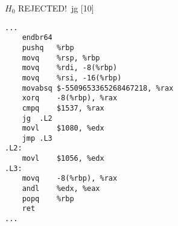 \begin{figure}[H]
    \centering
\begin{subfigure}[T]{0.2733333333333333\textwidth}
\vspace*{2mm}\tiny {\color{red}$H_0$ REJECTED!}\ \vspace*{2mm}\tiny jg [10]
\begin{lstlisting}[style=defstyle,language={[x86masm]Assembler},basicstyle=\tiny\ttfamily,breaklines=true]
...
	endbr64
	pushq	%rbp
	movq	%rsp, %rbp
	movq	%rdi, -8(%rbp)
	movq	%rsi, -16(%rbp)
	movabsq	$-5509653365268467218, %rax
	xorq	-8(%rbp), %rax
	cmpq	$1537, %rax
	jg	.L2
	movl	$1080, %edx
	jmp	.L3
.L2:
	movl	$1056, %edx
.L3:
	movq	-8(%rbp), %rax
	andl	%edx, %eax
	popq	%rbp
	ret
...\end{lstlisting}
\end{subfigure}
\end{figure}